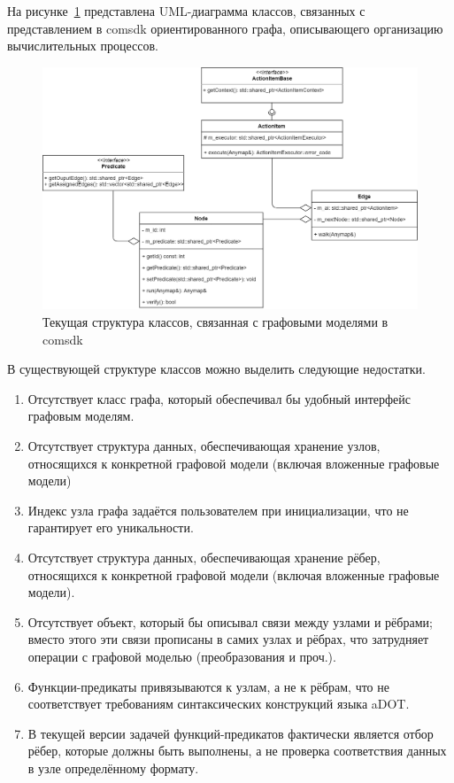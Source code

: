 \def\notedate{2022.03.09}
\def\currentauthor{Тришин И.В. (РК6)}


На рисунке~\ref{fig:oldGraphStructure} представлена \textsf{UML}-диаграмма классов, связанных с представлением в \textsf{comsdk} ориентированного графа, описывающего организацию вычислительных процессов.

\begin{figure}[H]
    \includegraphics[width=\textwidth]{ResearchNotes/rndhpc_not_blo_2022_03_09/structure.png}
    \caption{Текущая структура классов, связанная с графовыми моделями в comsdk}\label{fig:oldGraphStructure}
\end{figure}

В существующей структуре классов можно выделить следующие недостатки.
\begin{enumerate}
    \item Отсутствует класс графа, который обеспечивал бы удобный интерфейс графовым моделям.
    \item Отсутствует структура данных, обеспечивающая хранение узлов, относящихся к конкретной графовой модели (включая вложенные графовые модели)%
    \item Индекс узла графа задаётся пользователем при инициализации, что не гарантирует его уникальности.
    \item Отсутствует структура данных, обеспечивающая хранение рёбер, относящихся к конкретной графовой модели (включая вложенные графовые модели). %
    \item Отсутствует объект, который бы описывал связи между узлами и рёбрами; вместо этого эти связи прописаны в самих узлах и рёбрах, что затрудняет операции с графовой моделью (преобразования и проч.).
    \item Функции-предикаты привязываются к узлам, а не к рёбрам, что не соответствует требованиям синтаксических конструкций языка \gls{aDOT}.
    \item В текущей версии задачей функций-предикатов фактически является отбор рёбер, которые должны быть выполнены, а не проверка соответствия данных в узле определённому формату.
\end{enumerate}

\noteattributes{}
